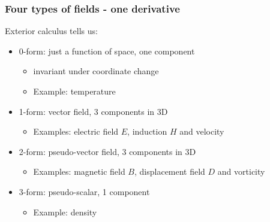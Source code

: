 \documentclass[aspectratio=169]{beamer}
\begin{document}
\begin{frame}[t]
  \frametitle{Four types of fields - one derivative}
    \begin{block}{Exterior calculus tells us:}
      \begin{itemize}%
	  \item {\color{red} 0-form}: just a function of space, one component
        \begin{itemize}
          \item invariant under coordinate change
          \item Example: temperature
        \end{itemize}
      \item {\color{red} 1-form}: vector field, 3 components in 3D
        \begin{itemize}
          \item Examples: electric field $E$, induction $H$ and velocity
        \end{itemize}
      \item {\color{red} 2-form}: pseudo-vector field, 3 components in 3D
         \begin{itemize}
          \item Examples: magnetic field $B$, displacement field $D$ and vorticity
        \end{itemize}
   \item {\color{red} 3-form}: pseudo-scalar, 1 component
         \begin{itemize}
          \item Example: density
        \end{itemize}
    \end{itemize}
  \end{block}
\end{frame}
\end{document}
